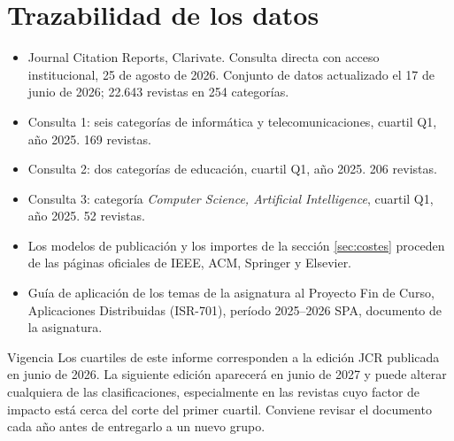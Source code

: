\documentclass[11pt,a4paper]{article}
\begin{document}
\section{Trazabilidad de los datos}

\begin{itemize}[leftmargin=*,itemsep=3pt]
	\item Journal Citation Reports, Clarivate. Consulta directa con acceso institucional, 25 de agosto de 2026. Conjunto de datos actualizado el 17 de junio de 2026; 22.643 revistas en 254 categorías.
	\item Consulta 1: seis categorías de informática y telecomunicaciones, cuartil Q1, año 2025. 169 revistas.
	\item Consulta 2: dos categorías de educación, cuartil Q1, año 2025. 206 revistas.
	\item Consulta 3: categoría \emph{Computer Science, Artificial Intelligence}, cuartil Q1, año 2025. 52 revistas.
	\item Los modelos de publicación y los importes de la sección \ref{sec:costes} proceden de las páginas oficiales de IEEE, ACM, Springer y Elsevier.
	\item Guía de aplicación de los temas de la asignatura al Proyecto Fin de Curso, Aplicaciones Distribuidas (ISR-701), período 2025--2026 SPA, documento de la asignatura.
\end{itemize}

\vspace{10pt}
\begin{aviso}{Vigencia}
	Los cuartiles de este informe corresponden a la edición JCR publicada en junio de 2026. La siguiente edición aparecerá en junio de 2027 y puede alterar cualquiera de las clasificaciones, especialmente en las revistas cuyo factor de impacto está cerca del corte del primer cuartil. Conviene revisar el documento cada año antes de entregarlo a un nuevo grupo.
\end{aviso}
\end{document}
